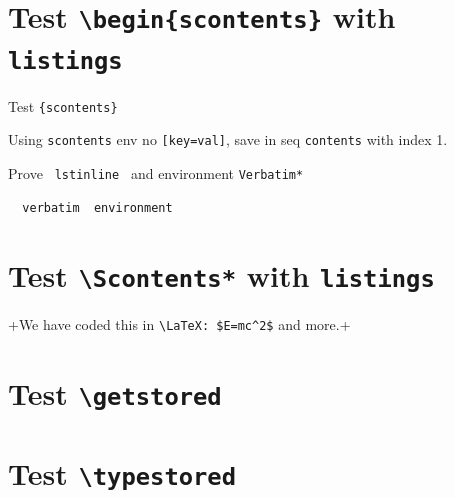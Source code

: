 \documentclass{article}
\begin{document}
\section{Test \texttt{\textbackslash begin\{scontents\}} with \texttt{listings}}
Test \verb+{scontents}+ \par

\begin{scontents}
Using \verb+scontents+ env no \verb+[key=val]+, save in seq \verb+contents+ with index 1.\par

Prove \lstinline[basicstyle=\ttfamily]| lstinline | and environment \verb+Verbatim*+
\begin{verbatim}
  verbatim  environment
\end{verbatim}
\end{scontents}

\section{Test \texttt{\textbackslash Scontents*} with \texttt{listings}}

\Scontents*+We have coded this in \lstinline[basicstyle=\ttfamily]|\LaTeX: $E=mc^2$|
and more.+

\section{Test \texttt{\textbackslash getstored}}
\par
{}

\section{Test \texttt{\textbackslash typestored}}
\end{document}
